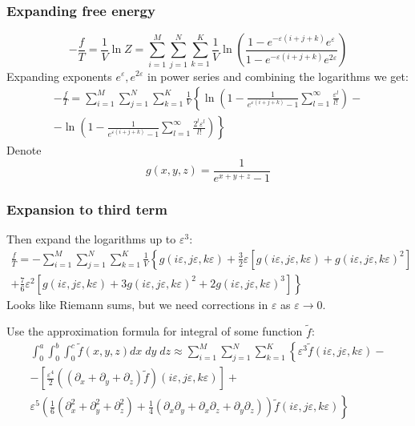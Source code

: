 \documentclass[pdftex]{beamer}
\theoremstyle{definition} \newtheorem{Def}{Definition}
\begin{document}
\begin{frame}
  \frametitle{Expanding free energy}
  \begin{equation}
    \label{eq:1}
     -\frac{f}{T}=\frac{1}{V}\ln Z = \sum_{i=1}^{M} \sum_{j=1}^{N} \sum_{k=1}^{K} \frac{1}{V}
  \ln\left(\frac{1-e^{-\varepsilon (i+j+k)} e^{\varepsilon}}{1-e^{-\varepsilon (i+j+k)} e^{2\varepsilon}}\right)
\end{equation}
Expanding exponents $e^{\varepsilon}, e^{2\varepsilon}$ in power series and combining the logarithms we get:
\begin{multline}
  \label{eq:2}
   -\frac{f}{T}= \sum_{i=1}^{M} \sum_{j=1}^{N} \sum_{k=1}^{K} \frac{1}{V}\left\{
    \ln\left(1-\frac{1}{e^{\varepsilon(i+j+k)}-1}\sum_{l=1}^{\infty} \frac{\varepsilon^{l}}{l!}\right)-\right.\\
  -\left.\ln\left(1-\frac{1}{e^{\varepsilon(i+j+k)}-1}\sum_{l=1}^{\infty} \frac{2^{l}\varepsilon^{l}}{l!}\right)\right\}
\end{multline}
Denote
\begin{equation}
  \label{eq:5}
  g(x,y,z)=\frac{1}{e^{x+y+z}-1}
\end{equation}
\end{frame}
\begin{frame}
  \frametitle{Expansion to third term}
Then expand the logarithms up to $\varepsilon^{3}$:
\begin{multline}
  \label{eq:4}
  \frac{f}{T}=- \sum_{i=1}^{M} \sum_{j=1}^{N} \sum_{k=1}^{K} \frac{1}{V}\left\{
    g(i\varepsilon,j\varepsilon,k\varepsilon)+\frac{3}{2}\varepsilon\left[g(i\varepsilon,j\varepsilon,k\varepsilon)+g(i\varepsilon,j\varepsilon,k\varepsilon)^{2}\right]\right.\\
  \left.+\frac{7}{6}\varepsilon^{2}\left[g(i\varepsilon,j\varepsilon,k\varepsilon)+3 g(i\varepsilon,j\varepsilon,k\varepsilon)^{2}+2 g(i\varepsilon,j\varepsilon,k\varepsilon)^{3}\right]\right\}  
\end{multline}
Looks like Riemann sums, but we need corrections in $\varepsilon$ as $\varepsilon\to 0$.

Use the approximation formula for integral of some function $\tilde{f}$:
\begin{multline}
  \label{eq:21}
  \int_{0}^{a} \int_{0}^{b}\int_{0}^{c}\tilde{f}(x,y,z) dx\; dy\;
  dz\approx\sum_{i=1}^{M}\sum_{j=1}^{N}\sum_{k=1}^{K}\left\{\varepsilon^{3}\tilde{f}\left(i\varepsilon,j\varepsilon,k\varepsilon\right)-\right.\\
  \left.-\left[\frac{\varepsilon^{4}}{2}\left((\partial_{x}+\partial_{y}+\partial_{z})\tilde{f}\right)(i\varepsilon,j\varepsilon,k\varepsilon)\right]+\right.\\
  \left.\varepsilon^{5}\left(\frac{1}{6}(\partial_{x}^{2}+\partial_{y}^{2}+\partial_{z}^{2})+\frac{1}{4}(\partial_{x}\partial_{y}+\partial_{x}\partial_{z}+\partial_{y}\partial_{z})\right)\tilde{f}\left(i\varepsilon,j\varepsilon,k\varepsilon\right)  \right\}
\end{multline}
\end{frame}
\end{document}
